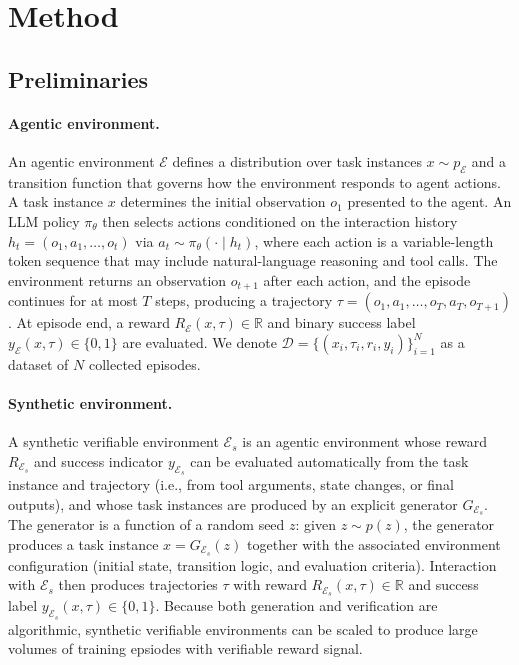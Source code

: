 
\section{Method}

\subsection{Preliminaries}

\paragraph{Agentic environment.}
An agentic environment $\mathcal{E}$ defines a distribution over task instances $x \sim p_{\mathcal{E}}$ and a transition function that governs how the environment responds to agent actions. A task instance $x$ determines the initial observation $o_1$ presented to the agent. An LLM policy $\pi_\theta$ then selects actions conditioned on the interaction history $h_t = (o_1, a_1, \dots, o_t)$ via $a_t \sim \pi_\theta(\cdot \mid h_t)$, where each action is a variable-length token sequence that may include natural-language reasoning and tool calls. The environment returns an observation $o_{t+1}$ after each action, and the episode continues for at most $T$ steps, producing a trajectory $\tau = (o_1, a_1, \dots, o_T, a_T, o_{T+1})$. At episode end, a reward $R_{\mathcal{E}}(x, \tau) \in \mathbb{R}$ and binary success label $y_{\mathcal{E}}(x, \tau) \in \{0, 1\}$ are evaluated. We denote $\mathcal{D} = \{(x_i, \tau_i, r_i, y_i)\}_{i=1}^N$ as a dataset of $N$ collected episodes.

\paragraph{Synthetic environment.}
A synthetic verifiable environment $\mathcal{E}_s$ is an agentic environment whose reward $R_{\mathcal{E}_s}$ and success indicator $y_{\mathcal{E}_s}$ can be evaluated automatically from the task instance and trajectory (i.e., from tool arguments, state changes, or final outputs), and whose task instances are produced by an explicit generator $G_{\mathcal{E}_s}$. The generator is a function of a random seed $z$: given $z \sim p(z)$, the generator produces a task instance $x = G_{\mathcal{E}_s}(z)$ together with the associated environment configuration (initial state, transition logic, and evaluation criteria). Interaction with $\mathcal{E}_s$ then produces trajectories $\tau$ with reward $R_{\mathcal{E}_s}(x,\tau) \in \mathbb{R}$ and success label $y_{\mathcal{E}_s}(x,\tau) \in \{0,1\}$. Because both generation and verification are algorithmic, synthetic verifiable environments can be scaled to produce large volumes of training epsiodes with verifiable reward signal.



